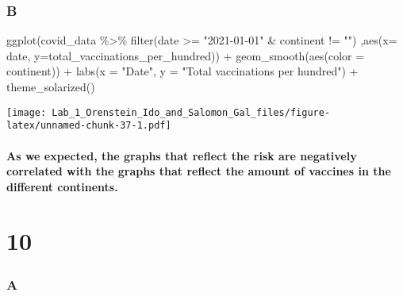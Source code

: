 \documentclass[
]{article}
\newenvironment{Shaded}{\begin{snugshade}}{\end{snugshade}}
\newcommand{\AttributeTok}[1]{\textcolor[rgb]{0.77,0.63,0.00}{#1}}
\newcommand{\FunctionTok}[1]{\textcolor[rgb]{0.00,0.00,0.00}{#1}}
\newcommand{\NormalTok}[1]{#1}
\newcommand{\SpecialCharTok}[1]{\textcolor[rgb]{0.00,0.00,0.00}{#1}}
\newcommand{\StringTok}[1]{\textcolor[rgb]{0.31,0.60,0.02}{#1}}
\begin{document}
\hypertarget{b-6}{%
\subsubsection{B}\label{b-6}}

\begin{Shaded}
\begin{Highlighting}[]
\FunctionTok{ggplot}\NormalTok{(covid\_data }\SpecialCharTok{\%\textgreater{}\%} \FunctionTok{filter}\NormalTok{(date }\SpecialCharTok{\textgreater{}=} \StringTok{"2021{-}01{-}01"} \SpecialCharTok{\&}\NormalTok{ continent }\SpecialCharTok{!=} \StringTok{""}\NormalTok{) ,}\FunctionTok{aes}\NormalTok{(}\AttributeTok{x=}\NormalTok{ date, }\AttributeTok{y=}\NormalTok{total\_vaccinations\_per\_hundred)) }\SpecialCharTok{+}
  \FunctionTok{geom\_smooth}\NormalTok{(}\FunctionTok{aes}\NormalTok{(}\AttributeTok{color =}\NormalTok{ continent)) }\SpecialCharTok{+}
  \FunctionTok{labs}\NormalTok{(}\AttributeTok{x =} \StringTok{"Date"}\NormalTok{, }\AttributeTok{y =} \StringTok{"Total vaccinations per hundred"}\NormalTok{) }\SpecialCharTok{+}
  \FunctionTok{theme\_solarized}\NormalTok{()}
\end{Highlighting}
\end{Shaded}

\texttt{[image: Lab\_1\_Orenstein\_Ido\_and\_Salomon\_Gal\_files/figure-latex/unnamed-chunk-37-1.pdf]}

\hypertarget{as-we-expected-the-graphs-that-reflect-the-risk-are-negatively-correlated-with-the-graphs-that-reflect-the-amount-of-vaccines-in-the-different-continents.}{%
\paragraph{As we expected, the graphs that reflect the risk are
negatively correlated with the graphs that reflect the amount of
vaccines in the different
continents.}\label{as-we-expected-the-graphs-that-reflect-the-risk-are-negatively-correlated-with-the-graphs-that-reflect-the-amount-of-vaccines-in-the-different-continents.}}

\hypertarget{section-9}{%
\section{10}\label{section-9}}

\hypertarget{a-7}{%
\subsubsection{A}\label{a-7}}
\end{document}

